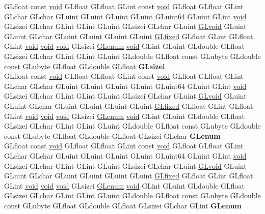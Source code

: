 \begin{DoxyCompactItemize}
\begin{tabbing}
\>GLfloat const \hyperlink{interfacevoid}{void} GLfloat GLfloat GLint const \hyperlink{interfacevoid}{void} GLfloat GLfloat GLint GLchar GLchar GLuint GLuint GLuint GLuint GLuint64 GLuint GLint \hyperlink{interfacevoid}{void} GLsizei GLchar GLint GLint GLuint GLsizei GLchar GLuint \hyperlink{interfacevoid}{GLvoid} GLuint GLuint GLchar GLuint GLuint GLuint GLuint \hyperlink{glheader_8h_ad6d3fa892df40dedf48ee6d84529ae5e}{GLfixed} GLfloat GLint GLfloat GLint \hyperlink{interfacevoid}{void} \hyperlink{interfacevoid}{void} \hyperlink{interfacevoid}{void} GLsizei \hyperlink{interfacevoid}{GLenum} \hyperlink{interfacevoid}{void} GLint GLuint GLdouble GLfloat GLsizei GLchar GLint GLint GLuint GLdouble GLfloat const GLubyte GLdouble const GLubyte GLfloat GLdouble GLfloat {\bfseries GLsizei}\\
\>GLfloat const \hyperlink{interfacevoid}{void} GLfloat GLfloat GLint const \hyperlink{interfacevoid}{void} GLfloat GLfloat GLint GLchar GLchar GLuint GLuint GLuint GLuint GLuint64 GLuint GLint \hyperlink{interfacevoid}{void} GLsizei GLchar GLint GLint GLuint GLsizei GLchar GLuint \hyperlink{interfacevoid}{GLvoid} GLuint GLuint GLchar GLuint GLuint GLuint GLuint \hyperlink{glheader_8h_ad6d3fa892df40dedf48ee6d84529ae5e}{GLfixed} GLfloat GLint GLfloat GLint \hyperlink{interfacevoid}{void} \hyperlink{interfacevoid}{void} \hyperlink{interfacevoid}{void} GLsizei \hyperlink{interfacevoid}{GLenum} \hyperlink{interfacevoid}{void} GLint GLuint GLdouble GLfloat GLsizei GLchar GLint GLint GLuint GLdouble GLfloat const GLubyte GLdouble const GLubyte GLfloat GLdouble GLfloat GLsizei GLchar {\bfseries GLenum}\\
\>GLfloat const \hyperlink{interfacevoid}{void} GLfloat GLfloat GLint const \hyperlink{interfacevoid}{void} GLfloat GLfloat GLint GLchar GLchar GLuint GLuint GLuint GLuint GLuint64 GLuint GLint \hyperlink{interfacevoid}{void} GLsizei GLchar GLint GLint GLuint GLsizei GLchar GLuint \hyperlink{interfacevoid}{GLvoid} GLuint GLuint GLchar GLuint GLuint GLuint GLuint \hyperlink{glheader_8h_ad6d3fa892df40dedf48ee6d84529ae5e}{GLfixed} GLfloat GLint GLfloat GLint \hyperlink{interfacevoid}{void} \hyperlink{interfacevoid}{void} \hyperlink{interfacevoid}{void} GLsizei \hyperlink{interfacevoid}{GLenum} \hyperlink{interfacevoid}{void} GLint GLuint GLdouble GLfloat GLsizei GLchar GLint GLint GLuint GLdouble GLfloat const GLubyte GLdouble const GLubyte GLfloat GLdouble GLfloat GLsizei GLchar GLint {\bfseries GLenum}\\

\end{tabbing}
\end{DoxyCompactItemize}
